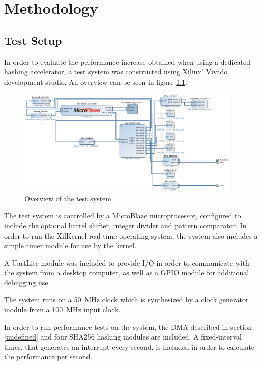 \chapter{Methodology}

\section{Test Setup}
In order to evaluate the performance increase obtained when using a dedicated
hashing accelerator, a test system was constructed using Xilinx' Vivado
development studio. An overview can be seen in figure \ref{fig:testsystem-vivado}.

\begin{figure}[ht]
	\includegraphics[width=0.95\textwidth]{Figures/testsystem-vivado.png}
	\caption{Overview of the test system}
	\label{fig:testsystem-vivado}
\end{figure}

The test system is controlled by a MicroBlaze microprocessor, configured to
include the optional barrel shifter, integer divider and pattern comparator.
In order to run the XilKernel real-time operating system, the system also
includes a simple timer module for use by the kernel.

A UartLite module was included to provide I/O in order to communicate with
the system from a desktop computer, as well as a GPIO module for additional
debugging use.

The system runs on a 50~MHz clock which is synthesized by a clock generator
module from a 100~MHz input clock.

In order to run performance tests on the system, the DMA described in
section \ref{undefined} and four
SHA256 hashing modules are included.
A fixed-interval timer, that generates an interrupt every second, is
included in order to calculate the performance per second.

